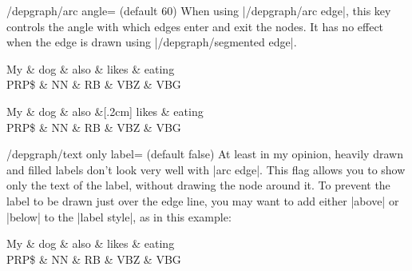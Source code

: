 \documentclass[a4paper]{ltxdoc}
\begin{document}
\begin{key}{/depgraph/arc angle= (default 60)}
   When using |/depgraph/arc edge|, this key controls the angle with which edges enter and exit the nodes. It has no effect when the edge is drawn using |/depgraph/segmented edge|.
\begin{codeexample}[]
\begin{dependency}[arc edge, arc angle=80]
   \begin{deptext}[column sep=.7cm]
      My \& dog \& also \& likes \& eating \\
      PRP\$ \& NN \& RB \& VBZ \& VBG \\
   \end{deptext}
\end{dependency}
\quad
\begin{dependency}[arc edge, arc angle = 40] 
   \begin{deptext}[column sep=.7cm]
      My \& dog \& also \&[.2cm] likes \& eating \\
      PRP\$ \& NN \& RB \& VBZ \& VBG \\
   \end{deptext}
\end{dependency}
\end{codeexample}
\end{key}

\begin{key}{/depgraph/text only label= (default false)}
   At least in my opinion, heavily drawn and filled labels don't look very well with |arc edge|. This flag allows you to show only the text of the label, without drawing the node around it. To prevent the label to be drawn just over the edge line, you may want to add either |above| or |below| to the |label style|, as in this example:
\begin{codeexample}[]
   \begin{dependency}[arc edge, arc angle=80, text only label, label style={above}]
   \begin{deptext}[column sep=.7cm]
      My \& dog \& also \& likes \& eating \\
      PRP\$ \& NN \& RB \& VBZ \& VBG \\
   \end{deptext}
\end{dependency}
\end{codeexample}
\end{key}
\end{document}
